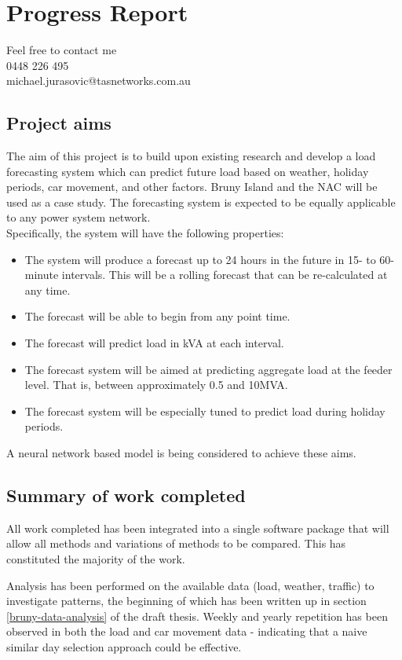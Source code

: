 \chapter*{Progress Report}
Feel free to contact me \\
0448 226 495 \\
michael.jurasovic@tasnetworks.com.au

\section{Project aims}
The aim of this project is to build upon existing research and develop a load forecasting system which can predict future load based on weather, holiday periods, car movement, and other factors. 
Bruny Island and the NAC will be used as a case study. 
The forecasting system is expected to be equally applicable to any power system network.
\\
Specifically, the system will have the following properties:
\begin{itemize}
	\item The system will produce a forecast up to 24 hours in the future in 15- to 60-minute intervals. This will be a rolling forecast that can be re-calculated at any time.
	\item The forecast will be able to begin from any point time.
	\item The forecast will predict load in kVA at each interval.
	\item The forecast system will be aimed at predicting aggregate load at the feeder level. That is, between approximately 0.5 and 10MVA.
	\item The forecast system will be especially tuned to predict load during holiday periods.
\end{itemize}
\par
A neural network based model is being considered to achieve these aims.


\section{Summary of work completed}
All work completed has been integrated into a single software package that will allow all methods and variations of methods to be compared. This has constituted the majority of the work.

Analysis has been performed on the available data (load, weather, traffic) to investigate patterns, the beginning of which has been written up in section \ref{bruny-data-analysis} of the draft thesis.
Weekly and yearly repetition has been observed in both the load and car movement data - indicating that a naive similar day selection approach could be effective.


